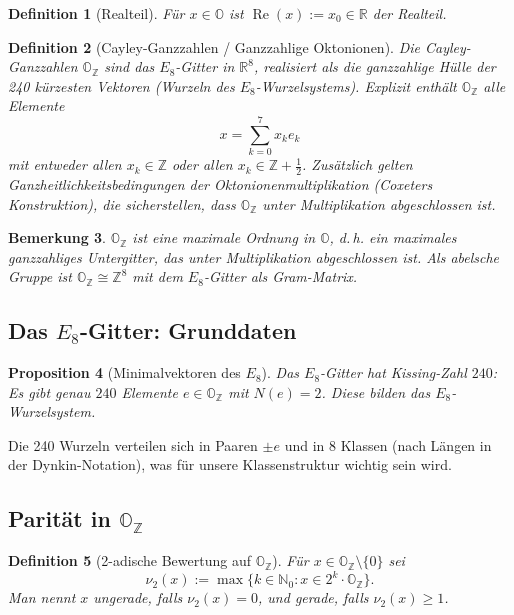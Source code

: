 \documentclass[12pt,a4paper]{article}
\newtheorem{definition}{Definition}[section]
\newtheorem{proposition}[definition]{Proposition}
\newtheorem{bemerkung}[definition]{Bemerkung}
\newcommand{\vii}{\nu_2}           %
\newcommand{\OZ}{\mathbb{O}_{\mathbb{Z}}}  %
\newcommand{\OO}{\mathbb{O}}       %
\newcommand{\Norm}[1]{N(#1)}       %
\renewcommand{\Re}{\operatorname{Re}}
\newcommand{\N}{\mathbb{N}}
\newcommand{\Z}{\mathbb{Z}}
\newcommand{\R}{\mathbb{R}}
\begin{document}
\begin{definition}[Realteil]
Für $x \in \OO$ ist $\Re(x) := x_0 \in \R$ der \emph{Realteil}.
\end{definition}

\begin{definition}[Cayley-Ganzzahlen / Ganzzahlige Oktonionen]
Die \emph{Cayley-Ganzzahlen} $\OZ$ sind das $E_8$-Gitter in $\R^8$,
realisiert als die ganzzahlige Hülle der 240 kürzesten Vektoren
(Wurzeln des $E_8$-Wurzelsystems). Explizit enthält $\OZ$ alle Elemente
\[
  x = \sum_{k=0}^7 x_k e_k
\]
mit entweder allen $x_k \in \Z$ oder allen $x_k \in \Z + \tfrac{1}{2}$.
Zusätzlich gelten Ganzheitlichkeitsbedingungen der Oktonionenmultiplikation
\textup{(}Coxeters Konstruktion\textup{)}, die sicherstellen, dass $\OZ$ unter
Multiplikation abgeschlossen ist.
\end{definition}

\begin{bemerkung}
$\OZ$ ist eine \emph{maximale Ordnung} in $\OO$, d.\,h. ein maximales
ganzzahliges Untergitter, das unter Multiplikation abgeschlossen ist.
Als abelsche Gruppe ist $\OZ \cong \Z^8$ mit dem $E_8$-Gitter als
Gram-Matrix.
\end{bemerkung}

\subsection{Das \texorpdfstring{$E_8$}{E8}-Gitter: Grunddaten}

\begin{proposition}[Minimalvektoren des $E_8$]\label{prop:kissing}
Das $E_8$-Gitter hat Kissing-Zahl $240$: Es gibt genau $240$
Elemente $e \in \OZ$ mit $\Norm{e} = 2$. Diese bilden das $E_8$-Wurzelsystem.
\end{proposition}

Die 240 Wurzeln verteilen sich in Paaren $\pm e$ und in 8 Klassen
(nach Längen in der Dynkin-Notation), was für unsere Klassenstruktur
wichtig sein wird.

\subsection{Parität in \texorpdfstring{$\OZ$}{OZ}}

\begin{definition}[2-adische Bewertung auf $\OZ$]\label{def:nu2}
Für $x \in \OZ \setminus \{0\}$ sei
\[
  \vii(x) := \max\{k \in \N_0 : x \in 2^k \cdot \OZ\}.
\]
Man nennt $x$ \emph{ungerade}, falls $\vii(x) = 0$, und \emph{gerade},
falls $\vii(x) \geq 1$.
\end{definition}
\end{document}
